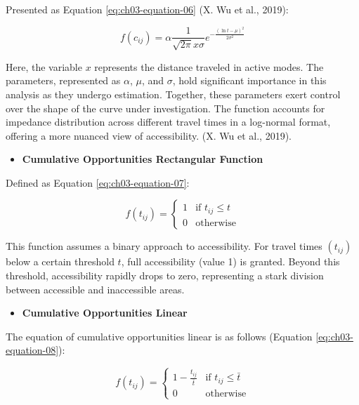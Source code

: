 \documentclass[
11pt, %
oneside, %
english, %
singlespacing, %
]{macthesis} %
\def\tightlist{}
\begin{document}
Presented as Equation \ref{eq:ch03-equation-06} (X. Wu et al., 2019):

\begin{equation}
f(c_{ij}) = \alpha \frac{1}{\sqrt{2\pi} x \sigma} e^{-\frac{(\ln t - \mu)^2}{2\sigma^2}}
\label{eq:ch03-equation-06}
\end{equation}

Here, the variable \(x\) represents the distance traveled in active modes. The parameters, represented as \(\alpha\), \(\mu\), and \(\sigma\), hold significant importance in this analysis as they undergo estimation. Together, these parameters exert control over the shape of the curve under investigation. The function accounts for impedance distribution across different travel times in a log-normal format, offering a more nuanced view of accessibility. (X. Wu et al., 2019).

\begin{itemize}
\tightlist
\item
  \textbf{Cumulative Opportunities Rectangular Function}
\end{itemize}

Defined as Equation \ref{eq:ch03-equation-07}:

\begin{equation}
f(t_{ij}) =
\begin{cases}
  1 & \text{if } t_{ij} \le t \\
  0 & \text{otherwise}
\end{cases}
\label{eq:ch03-equation-07}
\end{equation}

This function assumes a binary approach to accessibility. For travel times \((t_{ij})\) below a certain threshold \(t\), full accessibility (value 1) is granted. Beyond this threshold, accessibility rapidly drops to zero, representing a stark division between accessible and inaccessible areas.

\begin{itemize}
\tightlist
\item
  \textbf{Cumulative Opportunities Linear}
\end{itemize}

The equation of cumulative opportunities linear is as follows (Equation \ref{eq:ch03-equation-08}):

\begin{equation}
f(t_{ij}) =
\begin{cases}
  1 - \frac{t_{ij}}{\bar{t}} & \text{if } t_{ij} \le \bar{t} \\
  0 & \text{otherwise}
\end{cases}
\label{eq:ch03-equation-08}
\end{equation}
\end{document}
